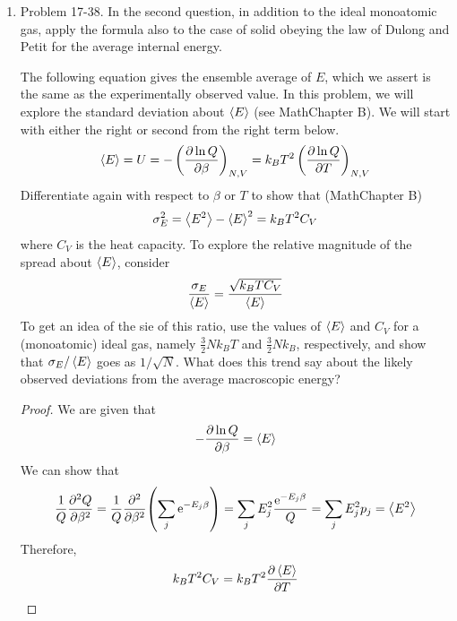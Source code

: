 \documentclass[../psets.tex]{subfiles}
\begin{document}
\begin{enumerate}
\begin{enumerate}
\begin{proof}
\begin{gather*}
            \end{gather*}
        \end{proof}
    \end{enumerate}
    \item Problem 17-38. In the second question, in addition to the ideal monoatomic gas, apply the formula also to the case of solid obeying the law of Dulong and Petit for the average internal energy.\par
    The following equation gives the ensemble average of $E$, which we assert is the same as the experimentally observed value. In this problem, we will explore the standard deviation about $\prb{E}$ (see MathChapter B). We will start with either the right or second from the right term below.
    \begin{equation*}
        \prb{E} = U
        = -\left( \pdv{\ln Q}{\beta} \right)_{N,V}
        = k_BT^2\left( \pdv{\ln Q}{T} \right)_{N,V}
    \end{equation*}
    Differentiate again with respect to $\beta$ or $T$ to show that (MathChapter B)
    \begin{equation*}
        \sigma_E^2 = \prb{E^2}-\prb{E}^2 = k_BT^2C_V
    \end{equation*}
    where $C_V$ is the heat capacity. To explore the relative magnitude of the spread about $\prb{E}$, consider
    \begin{equation*}
        \frac{\sigma_E}{\prb{E}} = \frac{\sqrt{k_BTC_V}}{\prb{E}}
    \end{equation*}
    To get an idea of the sie of this ratio, use the values of $\prb{E}$ and $C_V$ for a (monoatomic) ideal gas, namely $\frac{3}{2}Nk_BT$ and $\frac{3}{2}Nk_B$, respectively, and show that $\sigma_E/\prb{E}$ goes as $1/\sqrt{N}$. What does this trend say about the likely observed deviations from the average macroscopic energy?
    \begin{proof}
        We are given that
        \begin{equation*}
            -\pdv{\ln Q}{\beta} = \prb{E}
        \end{equation*}
        We can show that
        \begin{equation*}
            \frac{1}{Q}\pdv[2]{Q}{\beta} = \frac{1}{Q}\pdv[2]{\beta}(\sum_j\e[-E_j\beta])
            = \sum_jE_j^2\frac{\e[-E_j\beta]}{Q}
            = \sum_jE_j^2p_j
            = \prb{E^2}
        \end{equation*}
        Therefore,
        \begin{align*}
            k_BT^2C_V &= k_BT^2\pdv{\prb{E}}{T}\\

\end{align*}
\end{proof}
\end{enumerate}
\end{document}
